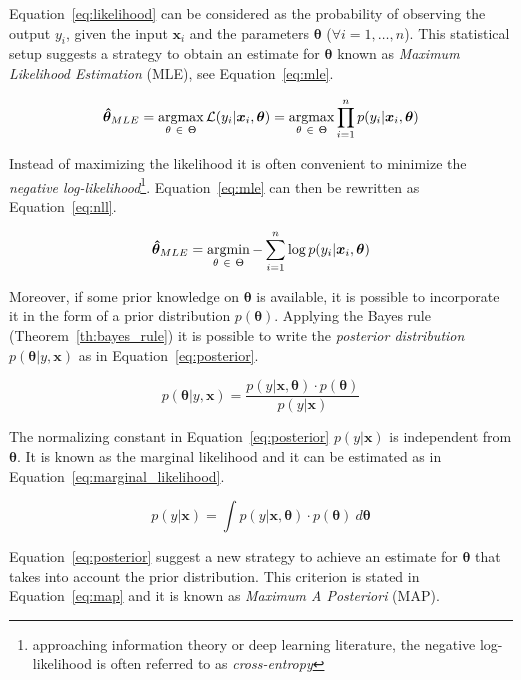 Equation~\eqref{eq:likelihood} can be considered as the probability of observing the output $y_i$, given the input $\bm{x}_i$ and the parameters $\bm{\theta}$ ($\forall i=1,\dots,n$).
This statistical setup suggests a strategy to obtain an estimate for $\bm{\theta}$ known as \textit{Maximum Likelihood Estimation} (MLE), see Equation~\eqref{eq:mle}.

\begin{equation} \label{eq:mle}
	\bm{\hat \theta}_{MLE} =\mathop{\mathrm{argmax}}\limits_{\theta~\in~\Theta}\mathcal{L}(y_i|\bm{x}_i, \bm{\theta}) = \mathop{\mathrm{argmax}}\limits_{\theta~\in~\Theta} \prod_{i=1}^{n} p(y_i | \bm{x}_i, \bm{\theta})
\end{equation}

Instead of maximizing the likelihood it is often convenient to minimize the \textit{negative log-likelihood}\footnote{approaching information theory or deep learning literature, the negative log-likelihood is often referred to as \textit{cross-entropy}}. Equation~\eqref{eq:mle} can then be rewritten as Equation~\eqref{eq:nll}.

\begin{equation} \label{eq:nll}
	\bm{\hat \theta}_{MLE} = \mathop{\mathrm{argmin}}\limits_{\theta~\in~\Theta} - \sum_{i=1}^n \log p(y_i | \bm{x}_i, \bm{\theta})
\end{equation}

Moreover, if some prior knowledge on $\bm{\theta}$ is available, it is possible to incorporate it in the form of a prior distribution $p(\bm{\theta})$. Applying the Bayes rule (Theorem~\ref{th:bayes_rule}) it is possible to write the \textit{posterior distribution} $p(\bm{\theta}|y,\bm{x})$ as in Equation~\eqref{eq:posterior}.

\begin{equation} \label{eq:posterior}
	p(\bm{\theta}|y,\bm{x}) = \frac{p(y|\bm{x}, \bm{\theta}) \cdot p(\bm{\theta})}{p(y|\bm{x})}
\end{equation}

The normalizing constant in Equation~\eqref{eq:posterior} $p(y|\bm{x})$ is independent from $\bm{\theta}$. It is known as the marginal likelihood and it can be estimated as in Equation~\eqref{eq:marginal_likelihood}.

\begin{equation} \label{eq:marginal_likelihood}
	p(y|\bm{x}) = \int p(y|\bm{x}, \bm{\theta}) \cdot p(\bm{\theta})~d\bm{\theta}
\end{equation}

Equation~\eqref{eq:posterior} suggest a new strategy to achieve an estimate for $\bm{\theta}$ that takes into account the prior distribution. This criterion is stated in Equation~\eqref{eq:map} and it is known as \textit{Maximum A Posteriori} (MAP).


